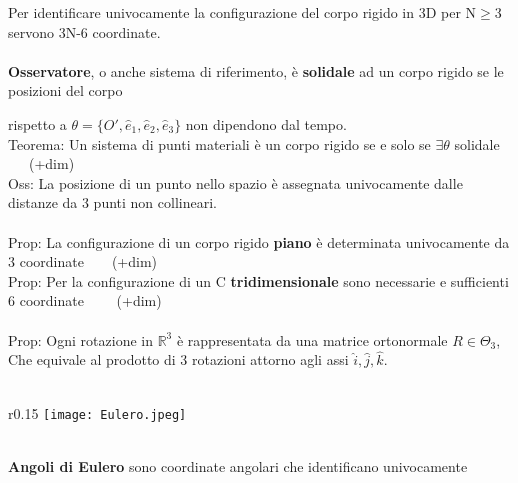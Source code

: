 \documentclass{article}
\begin{document}
Per identificare univocamente la configurazione del corpo rigido in 3D per N$\ge$3 servono 3N-6 coordinate. \\ \\
%
%
\textbf{Osservatore}, o anche sistema di riferimento, è \textbf{solidale} ad un corpo rigido se le posizioni del corpo 

rispetto a $\theta = \{O',\hat{e}_1, \hat{e}_2, \hat{e}_3 \} $ non dipendono dal tempo. \\
%
Teorema: Un sistema di punti materiali è un corpo rigido se e solo se $\exists \theta$ solidale \ \ \ (+dim) \\
%
Oss: La posizione di un punto nello spazio è assegnata univocamente dalle distanze da 3 punti non collineari. \\ \\
%
Prop: La configurazione di un corpo rigido \textbf{piano} è determinata univocamente da 3 coordinate\ \ \ \ (+dim)\\
%
Prop: Per la configurazione di un C \textbf{tridimensionale} sono necessarie e sufficienti 6 coordinate \ \ \ \ (+dim)\\ \\
%
%
%
Prop: Ogni rotazione in $\mathbb{R}^3$ è rappresentata da una matrice ortonormale $R\in\Theta_3$, \\
\phantom{Prop: }Che equivale al prodotto di 3 rotazioni attorno agli assi $\hat{i}, \hat{j}, \hat{k}$. \ \ \ \ \ \ \ \ \ \ \ \ \ \ \ \ \ \ \ \ \ \ \ \ \ \ \ \ \ \ \ \ \ \ \ \ \ \ \ \ \ \ \ \ \ \ \ \ \ \ \ \
%
%
%
\begin{wrapfigure}{r}{0.15\textwidth}
\texttt{[image: Eulero.jpeg]}
\end{wrapfigure} \\
%
%
\textbf{Angoli di Eulero} sono coordinate angolari che identificano univocamente 
\end{document}
